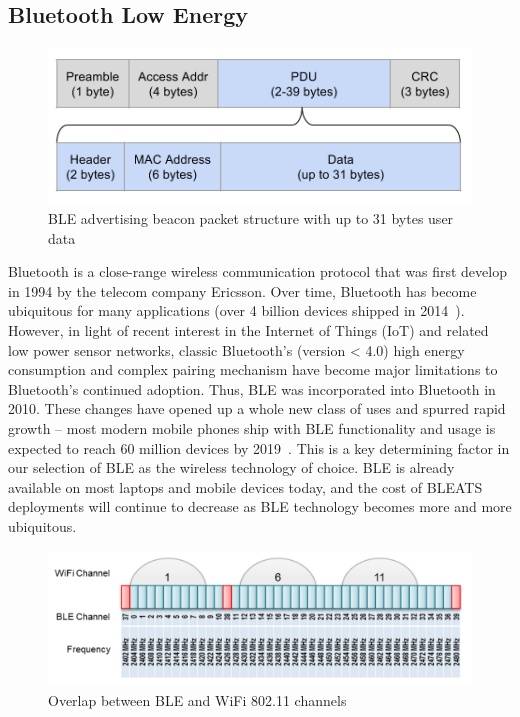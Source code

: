 \subsection{Bluetooth Low Energy}

\begin{figure} \centering
\includegraphics[width=\columnwidth]{figures/ble-packet.png} \caption{BLE
advertising beacon packet structure with up to 31 bytes user data}
\label{fig:ble-packet} \end{figure}

Bluetooth is a close-range wireless communication protocol that was first
develop in 1994 by the telecom company Ericsson. Over time, Bluetooth has
become ubiquitous for many applications (over 4 billion devices shipped in
2014~\cite{bluetooth-2014-annual-report}). However, in light of recent interest
in the Internet of Things (IoT) and related low power sensor networks, classic
Bluetooth's (version < 4.0) high energy consumption and complex pairing
mechanism have become major limitations to Bluetooth's continued adoption.
Thus, BLE was incorporated into Bluetooth in 2010. These changes have opened up
a whole new class of uses and spurred rapid growth -- most modern mobile phones
ship with BLE functionality and usage is expected to reach 60 million devices
by 2019~\cite{beacon-shipment-projection}. This is a key determining factor in
our selection of BLE as the wireless technology of choice. BLE is already
available on most laptops and mobile devices today, and the cost of BLEATS
deployments will continue to decrease as BLE technology becomes more and more
ubiquitous. 

\begin{figure} \centering
\includegraphics[width=\columnwidth]{figures/ble-wifi-coexistence.png}
\caption{Overlap between BLE and WiFi 802.11 channels}
\label{fig:ble-wifi-coexistence} \end{figure}

